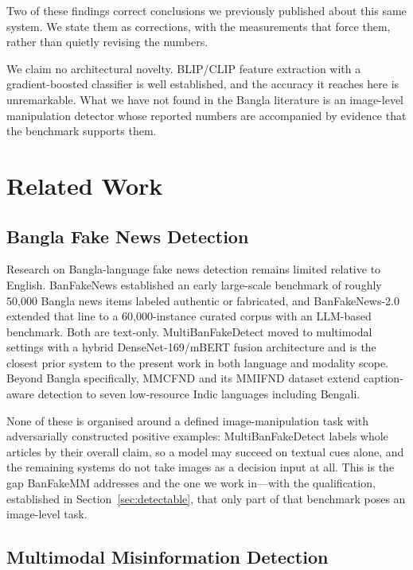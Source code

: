 \documentclass[journal]{IEEEtran}
\begin{document}
Two of these findings correct conclusions we previously published about this
same system. We state them as corrections, with the measurements that force
them, rather than quietly revising the numbers.

We claim no architectural novelty. BLIP/CLIP feature extraction with a
gradient-boosted classifier is well established, and the accuracy it reaches
here is unremarkable. What we have not found in the Bangla literature is an
image-level manipulation detector whose reported numbers are accompanied by
evidence that the benchmark supports them.

\section{Related Work}

\subsection{Bangla Fake News Detection}

Research on Bangla-language fake news detection remains limited relative to
English. BanFakeNews \cite{banfakenews} established an early large-scale
benchmark of roughly 50{,}000 Bangla news items labeled authentic or
fabricated, and BanFakeNews-2.0 \cite{banfakenews2} extended that line to a
60{,}000-instance curated corpus with an LLM-based benchmark. Both are
text-only. MultiBanFakeDetect \cite{multibanfake} moved to multimodal
settings with a hybrid DenseNet-169/mBERT fusion architecture and is the
closest prior system to the present work in both language and modality scope.
Beyond Bangla specifically, MMCFND and its MMIFND dataset \cite{mmcfnd} extend
caption-aware detection to seven low-resource Indic languages including
Bengali.

None of these is organised around a defined image-manipulation task with
adversarially constructed positive examples: MultiBanFakeDetect labels whole
articles by their overall claim, so a model may succeed on textual cues alone,
and the remaining systems do not take images as a decision input at all. This
is the gap BanFakeMM \cite{banfakemm} addresses and the one we work in---with
the qualification, established in Section~\ref{sec:detectable}, that only part
of that benchmark poses an image-level task.

\subsection{Multimodal Misinformation Detection}
\end{document}
